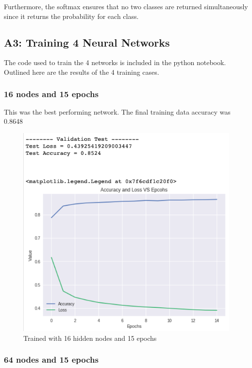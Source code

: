 \documentclass[a4paper, 12pt]{article}
\begin{document}
    Furthermore, the softmax ensures that no two classes are returned simultaneously since it returns the probability for each class.
    
    \subsection{A3: Training 4 Neural Networks}

    The code used to train the 4 networks is included in the python notebook. Outlined here are the results of the 4 training cases.
    
    \subsubsection{16 nodes and 15 epochs}

    This was the best performing network. The final training data accuracy was 0.8648

    \begin{figure}[h!]
        \centering
        \captionsetup{justification=centering}
        \includegraphics[scale = 0.37]{16_15.png}
        \caption{Trained with 16 hidden nodes and 15 epochs}
    \end{figure}

    \subsubsection{64 nodes and 15 epochs}
\end{document}
